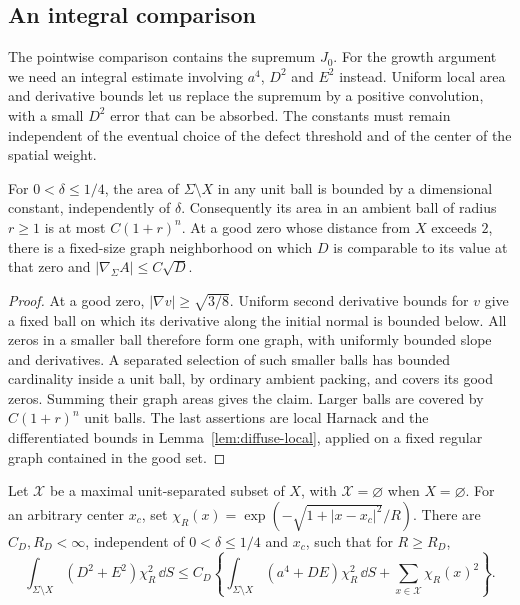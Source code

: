 \subsection{An integral comparison}

The pointwise comparison contains the supremum $J_0$.  For the growth
argument we need an integral estimate involving $a^4$, $D^2$ and $E^2$
instead.  Uniform local area and derivative bounds let us replace the
supremum by a positive convolution, with a small $D^2$ error that can
be absorbed.  The constants must remain independent of the eventual
choice of the defect threshold and of the center of the spatial weight.

\begin{lemma}\label{lem:interface-good-area}
For $0<\delta\le1/4$, the area of $\Sigma\setminus X$ in any unit
ball is bounded by a dimensional constant, independently of $\delta$.
Consequently its area in an ambient ball of radius $r\ge1$ is at
most $C(1+r)^n$.  At a good zero whose distance from $X$ exceeds $2$,
there is a fixed-size graph neighborhood on which $D$ is comparable
to its value at that zero and $|\nabla_\Sigma A|\le C\sqrt D$.
\end{lemma}

\begin{proof}
At a good zero, $|\nabla v|\ge\sqrt{3/8}$.
Uniform second derivative bounds for $v$ give a fixed ball on which
its derivative along the initial normal is bounded below.  All zeros
in a smaller ball therefore form one graph, with uniformly bounded
slope and derivatives.  A separated selection of such smaller balls
has bounded cardinality inside a unit ball, by ordinary ambient
packing, and covers its good zeros.  Summing their graph areas gives
the claim.  Larger balls are covered by $C(1+r)^n$ unit balls.
The last assertions are local Harnack and the differentiated bounds
in Lemma~\ref{lem:diffuse-local}, applied on a fixed regular
graph contained in the good set.
\end{proof}

\begin{lemma}\label{lem:interface-integral}
Let $\mathcal X$ be a maximal unit-separated subset of $X$, with
$\mathcal X=\varnothing$ when $X=\varnothing$.  For an arbitrary
center $x_c$, set
$\chi_R(x)=\exp(-\sqrt{1+|x-x_c|^2}/R)$.
There are $C_D,R_D<\infty$, independent of
$0<\delta\le1/4$ and $x_c$, such that for $R\ge R_D$,
\begin{equation}\label{eq:L11}
 \int_{\Sigma\setminus X}(D^2+E^2)\chi_R^2\,\dd S
 \le C_D\left\{
 \int_{\Sigma\setminus X}(a^4+DE)\chi_R^2\,\dd S
             +\sum_{x\in\mathcal X}\chi_R(x)^2\right\}.
\end{equation}
\end{lemma}

